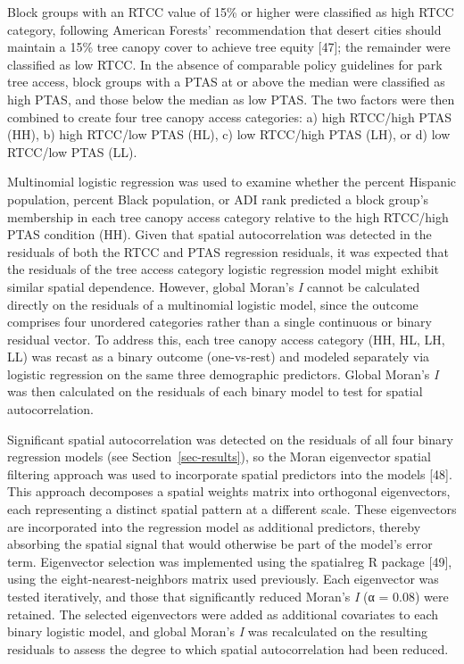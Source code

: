 \documentclass[
  sn-basic,
]{sn-jnl}
\begin{document}
Block groups with an RTCC value of 15\% or higher were classified as
high RTCC category, following American Forests' recommendation that
desert cities should maintain a 15\% tree canopy cover to achieve tree
equity {[}47{]}; the remainder were classified as low RTCC. In the
absence of comparable policy guidelines for park tree access, block
groups with a PTAS at or above the median were classified as high PTAS,
and those below the median as low PTAS. The two factors were then
combined to create four tree canopy access categories: a) high RTCC/high
PTAS (HH), b) high RTCC/low PTAS (HL), c) low RTCC/high PTAS (LH), or d)
low RTCC/low PTAS (LL).

Multinomial logistic regression was used to examine whether the percent
Hispanic population, percent Black population, or ADI rank predicted a
block group's membership in each tree canopy access category relative to
the high RTCC/high PTAS condition (HH). Given that spatial
autocorrelation was detected in the residuals of both the RTCC and PTAS
regression residuals, it was expected that the residuals of the tree
access category logistic regression model might exhibit similar spatial
dependence. However, global Moran's \emph{I} cannot be calculated
directly on the residuals of a multinomial logistic model, since the
outcome comprises four unordered categories rather than a single
continuous or binary residual vector. To address this, each tree canopy
access category (HH, HL, LH, LL) was recast as a binary outcome
(one-vs-rest) and modeled separately via logistic regression on the same
three demographic predictors. Global Moran's \emph{I} was then
calculated on the residuals of each binary model to test for spatial
autocorrelation.

Significant spatial autocorrelation was detected on the residuals of all
four binary regression models (see Section~\ref{sec-results}), so the
Moran eigenvector spatial filtering approach was used to incorporate
spatial predictors into the models {[}48{]}. This approach decomposes a
spatial weights matrix into orthogonal eigenvectors, each representing a
distinct spatial pattern at a different scale. These eigenvectors are
incorporated into the regression model as additional predictors, thereby
absorbing the spatial signal that would otherwise be part of the model's
error term. Eigenvector selection was implemented using the spatialreg R
package {[}49{]}, using the eight-nearest-neighbors matrix used
previously. Each eigenvector was tested iteratively, and those that
significantly reduced Moran's \emph{I} (α = 0.08) were retained. The
selected eigenvectors were added as additional covariates to each binary
logistic model, and global Moran's \emph{I} was recalculated on the
resulting residuals to assess the degree to which spatial
autocorrelation had been reduced.
\end{document}
